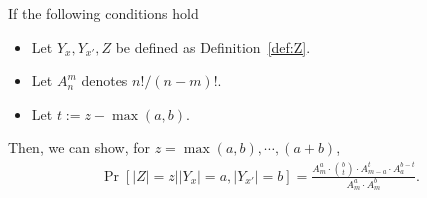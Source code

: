 \begin{lemma}\label{lem:distribution_of_Z}
If the following conditions hold
\begin{itemize}
    \item Let $Y_x, Y_{x'}, Z$ be defined as Definition~\ref{def:Z}.
    \item Let $A_n^m$ denotes $n! / (n-m)!$.
    \item Let $t := z - \max(a, b)$. 
\end{itemize}

Then, we can show, for $z = \max(a, b), \cdots, (a + b)$, 
\begin{align*}
    \Pr[|Z| = z | |Y_x| = a, |Y_{x'}| = b] = \frac{A_m^a \cdot \binom{b}{t} \cdot A_{m - a}^t \cdot A_{a}^{b-t}}{A_m^a \cdot A_m^b}.
\end{align*}
\end{lemma}

